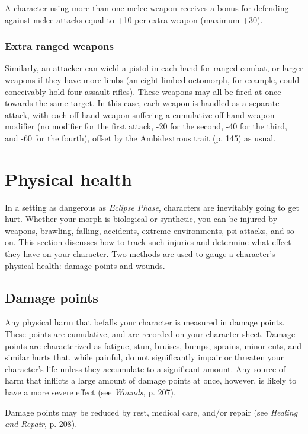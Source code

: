 A character using more than one melee weapon receives a bonus for defending against melee attacks equal to +10 per extra weapon (maximum +30).

\subsubsection{Extra ranged weapons}

Similarly, an attacker can wield a pistol in each hand for ranged combat, or larger weapons if they have more limbs (an eight-limbed octomorph, for example, could conceivably hold four assault rifles). These weapons may all be fired at once towards the same target. In this case, each weapon is handled as a separate attack, with each off-hand weapon suffering a cumulative off-hand weapon modifier (no modifier for the first attack, -20 for the second, -40 for the third, and -60 for the fourth), offset by the Ambidextrous trait (p. 145) as usual.

\section{Physical health}
\label{sec:physical-health}

In a setting as dangerous as \emph{Eclipse Phase}, characters are inevitably going to get hurt. Whether your morph is biological or synthetic, you can be injured by weapons, brawling, falling, accidents, extreme environments, psi attacks, and so on. This section discusses how to track such injuries and determine what effect they have on your character. Two methods are used to gauge a character’s physical health: damage points and wounds.

\subsection{Damage points}
\label{sec:damage-points}

Any physical harm that befalls your character is measured in damage points. These points are cumulative, and are recorded on your character sheet. Damage points are characterized as fatigue, stun, bruises, bumps, sprains, minor cuts, and similar hurts that, while painful, do not significantly impair or threaten your character’s life unless they accumulate to a significant amount. Any source of harm that inflicts a large amount of damage points at once, however, is likely to have a more severe effect (see \emph{Wounds}, p. 207).

Damage points may be reduced by rest, medical care, and/or repair (see \emph{Healing and Repair}, p. 208).



